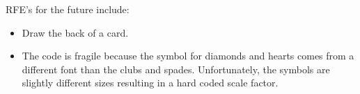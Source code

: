 \documentclass[11pt]{article}
\begin{document}
RFE's for the future include:

\begin{itemize}
\item Draw the back of a card.

\item The code is fragile because the symbol for diamonds and hearts
  comes from a different font than the clubs and spades.  Unfortunately,
  the symbols are slightly different sizes resulting in a hard coded
  scale factor.
\end{itemize}  

\CardAceSpades[0.3]
\CardTwoSpades[0.3]
\CardThreeSpades[0.3]
\CardFourSpades[0.3]
\CardFiveSpades[0.3]
\CardSixSpades[0.3]
\CardSevenSpades[0.3]
\CardEightSpades[0.3]
\CardNineSpades[0.3]
\CardTenSpades[0.3]
\CardJackSpades[0.3]
\CardQueenSpades[0.3]
\CardKingSpades[0.3]

\CardAceHearts[0.3]
\CardTwoHearts[0.3]
\CardThreeHearts[0.3]
\CardFourHearts[0.3]
\CardFiveHearts[0.3]
\CardSixHearts[0.3]
\CardSevenHearts[0.3]
\CardEightHearts[0.3]
\CardNineHearts[0.3]
\CardTenHearts[0.3]
\CardJackHearts[0.3]
\CardQueenHearts[0.3]
\CardKingHearts[0.3]

\CardAceDiamonds[0.3]
\CardTwoDiamonds[0.3]
\CardThreeDiamonds[0.3]
\CardFourDiamonds[0.3]
\CardFiveDiamonds[0.3]
\CardSixDiamonds[0.3]
\CardSevenDiamonds[0.3]
\CardEightDiamonds[0.3]
\CardNineDiamonds[0.3]
\CardTenDiamonds[0.3]
\CardJackDiamonds[0.3]
\CardQueenDiamonds[0.3]
\CardKingDiamonds[0.3]

\CardAceClubs[0.3]
\CardTwoClubs[0.3]
\CardThreeClubs[0.3]
\CardFourClubs[0.3]
\CardFiveClubs[0.3]
\CardSixClubs[0.3]
\CardSevenClubs[0.3]
\CardEightClubs[0.3]
\CardNineClubs[0.3]
\CardTenClubs[0.3]
\CardJackClubs[0.3]
\CardQueenClubs[0.3]
\CardKingClubs[0.3]
\end{document}
